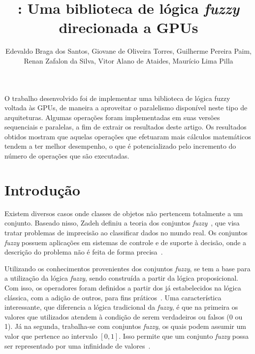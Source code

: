 \documentclass[12pt]{article}
\title{\libname: Uma biblioteca de lógica \textit{fuzzy} direcionada a GPUs}
\author{Edevaldo Braga dos Santos\inst{1}, Giovane de Oliveira Torres\inst{1}, Guilherme Pereira Paim\inst{1},\\ Renan Zafalon da Silva\inst{1}, Vitor Alano de Ataides\inst{1}, Maurício Lima Pilla\inst{1}}
\begin{document}
\newcommand{\libname}{CudaFuzzy}

\maketitle




\begin{resumo}

O trabalho desenvolvido foi de implementar uma biblioteca de lógica fuzzy voltada às GPUs, de maneira a aproveitar o paralelismo disponível neste tipo de arquiteturas. Algumas operações foram implementadas em suas versões sequenciais e paralelas, a fim de extrair os resultados deste artigo. Os resultados obtidos mostram que aquelas operações que efetuaram mais cálculos matemáticos tendem a ter melhor desempenho, o que é potencializado pelo incremento do número de operações que são executadas.

\end{resumo}

\section{Introdução}
\label{sec:introducao}


	Existem diversos casos onde classes de objetos não pertencem totalmente a um conjunto. Baseado nisso, Zadeh definiu a teoria dos conjuntos \textit{fuzzy}~\cite{zadeh:65}, que visa tratar problemas de imprecisão ao classificar dados no mundo real. Os conjuntos \textit{fuzzy} possuem aplicações em sistemas de controle e de suporte à decisão, onde a descrição do problema não é feita de forma precisa~\cite{weber:03}.
	
	Utilizando os conhecimentos provenientes dos conjuntos \textit{fuzzy}, se tem a base para a utilização da lógica \textit{fuzzy}, sendo construída a partir da lógica proposicional. Com isso, os operadores foram definidos a partir dos já estabelecidos na lógica clássica, com a adição de outros, para fins práticos~\cite{tanscheit:04}. Uma característica interessante, que diferencia a lógica tradicional da \textit{fuzzy}, é que na primeira os valores que utilizados atendem à condição de serem verdadeiros ou falsos (0 ou 1). Já na segunda, trabalha-se com conjuntos \textit{fuzzy}, os quais podem assumir um valor que pertence ao intervalo $[0, 1]$. Isso permite que um conjunto \textit{fuzzy} possa ser representado por uma infinidade de valores~\cite{klir:95}.	
	
\end{document}
